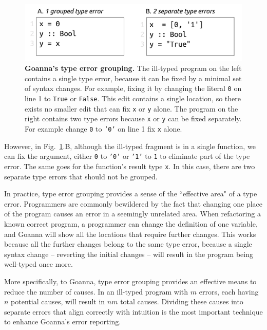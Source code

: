 \documentclass[pdflatex,sn-mathphys-num]{sn-jnl}%
\begin{document}
   \begin{figure}[ht!]
        \centering
        \includegraphics[width=0.8\linewidth]{images/Grouping-Example}
        \caption[Goanna's type error grouping]{\textbf{Goanna's type error grouping.} The ill-typed program on the left contains a single type error, because it can be fixed by a minimal set of syntax changes. For example, fixing it by changing the literal \texttt{0} on line 1 to \texttt{True} or \texttt{False}. This edit contains a single location, so there exists no smaller edit that can fix \texttt{x} or \texttt{y} alone. The program on the right contains two type errors because \texttt{x} or \texttt{y} can be fixed separately. For example change \texttt{0} to \texttt{'0'} on line 1 fix \texttt{x} alone. }
        \label{fig:grouping-example}
    \end{figure}


    However, in Fig.~\ref{fig:grouping-example}.B, although the ill-typed fragment is in a single function, we can fix the argument, either \texttt{0} to \texttt{'0'} or \texttt{'1'} to \texttt{1} to eliminate part of the type error. The same goes for the function's result type \texttt{x}. In this case, there are two separate type errors that should not be grouped.

	In practice, type error grouping provides a sense of the ``effective area" of a type error. Programmers are commonly bewildered by the fact that changing one place of the program causes an error in a seemingly unrelated area. When refactoring a known correct program, a programmer can change the definition of one variable, and Goanna will show all the locations that require further changes. This works because all the further changes belong to the same type error, because a single syntax change -- reverting the initial changes -- will result in the program being well-typed once more.
	
	More specifically, to Goanna, type error grouping provides an effective means to reduce the number of causes. In an ill-typed program with $m$ errors, each having $n$ potential causes, will result in $nm$ total causes. Dividing these causes into separate errors that align correctly with intuition is the most important technique to enhance Goanna's error reporting.
\end{document}
